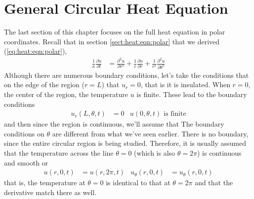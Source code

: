 \section{General Circular Heat Equation}


The last section of this chapter focuses on the full heat equation in polar coordinates.  Recall that in section \ref{sect:heat:eqn:polar} that we derived (\ref{eq:heat:eqn:polar}),
%
\begin{align*}
\frac{1}{\kappa} \frac{\partial u}{\partial t} & = \frac{\partial^2 u}{\partial {r}^2}  + \frac{1}{r} \frac{\partial u}{\partial r}+ \frac{1}{r^2} \frac{\partial^2 u}{\partial {\theta}^2}
\end{align*}
Although there are numerous boundary conditions, let's take the conditions that on the edge of the region ($r=L$) that $u_r =0$, that is it is insulated.  When $r=0$, the center of the region, the temperature $u$ is finite.  These lead to the boundary conditions
%
\begin{align}
u_r(L,\theta,t) & = 0 & u(0,\theta,t) \text{~is finite} \label{eq:heat:eqn:polar:bc1}
\end{align}
and then since the region is continuous, we'll assume that
%
The boundary conditions on $\theta$ are different from what we've seen earlier.  There is no boundary, since the entire circular region is being studied.  Therefore, it is usually assumed that the temperature across the line $\theta=0$ (which is also $\theta=2\pi$) is continuous and smooth or 
\begin{align}
u(r,0,t) &= u(r,2\pi,t)&  u_{\theta}(r,0,t) & = u_{\theta} (r,0,t) \label{eq:heat:eqn:polar:bc2}
\end{align}
that is, the temperature at $\theta=0$ is identical to that at $\theta=2\pi$ and that the derivative match there as well.  



